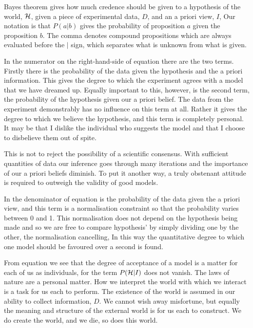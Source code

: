 Bayes theorem gives how much credence should be given to a hypothesis of
the world, ${\cal H}$,
given a piece of experimental data, $D$, and an a priori view, $I$,
Our notation is that $P(a|b)$ gives the probability of proposition $a$
given the proposition
$b$.
The comma denotes compound propositions which are always evaluated
before the $|$ sign, which separates what is unknown from what is given.


In the numerator on the right-hand-side of equation  there are the
two terms.
Firstly there is the  probability of the data given the hypothesis and the a
priori information.
This gives the degree to which the experiment agrees with a model that
we have dreamed up.
Equally important to this, however,
is the second term, 
the probability of the hypothesis given our a priori belief.
The data from the experiment demonstrably has no influence
on this term at all.
Rather it gives the degree to which we believe the hypothesis,
and this term is completely personal.
It may be that I dislike the individual who suggests the model and that I
choose to disbelieve them out of spite.

This is not to reject the possibility of a scientific consensus.
With sufficient quantities of data our inference goes through many
iterations and the importance of our a priori beliefs diminish.
To put it another way,
a truly obstenant attitude is required to outweigh the validity of
good models.

In the denominator of equation  is  the probability of the data given the a priori view,
and this term is a normalisation constraint so that the  probability varies between
0 and 1.
This normalisation does not depend on the hypothesis being made and so
we are free to compare hypothesis' by simply dividing one by the
other, 
the normalisation cancelling,
In this way the quantitative degree to which one model should be favoured
over a second is found.

From equation  we see that the degree of acceptance
of a model is a matter for 
each of us as individuals, for 
the term $P({\cal H}|I)$ does not vanish.
The laws of nature are a personal matter.
How we interpret the  world with which we interact is a task for
us each to perform.
The existence of the world is assumed in our ability to
collect information, $D$.
We cannot wish away misfortune,
but equally the meaning and structure of the external world is for us each
to construct. 
We do create the world, 
and we  die, so does this world. %

